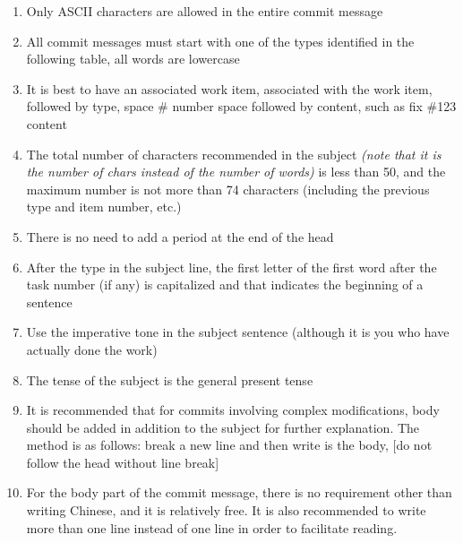 \documentclass[a4paper]{report}
\begin{document}
\begin{enumerate}
\item
Only ASCII characters are allowed in the entire commit message
\item
All commit messages must start with one of the types identified in the following table, all words are lowercase
\item
It is best to have an associated work item, associated with the work item, followed by type, space \# number space followed by content, such as fix \#123 content
\item
The total number of characters recommended in the subject \emph{(note that it is the number of chars instead of the number of words)} is less than 50, and the maximum number is not more than 74 characters (including the previous type and item number, etc.)
\item
There is no need to add a period at the end of the head
\item 
After the type in the subject line, the first letter of the first word after the task number (if any) is capitalized and that indicates the beginning of a sentence
\item
Use the imperative tone in the subject sentence (although it is you who have actually done the work)
\item
The tense of the subject is the general present tense
\item
It is recommended that for commits involving complex modifications, body should be added in addition to the subject for further explanation. The method is as follows: break a new line and then write is the body, [do not follow the head without line break]
\item
For the body part of the commit message, there is no requirement other than writing Chinese, and it is relatively free. It is also recommended to write more than one line instead of one line in order to facilitate reading.
\end{enumerate}
\end{document}
